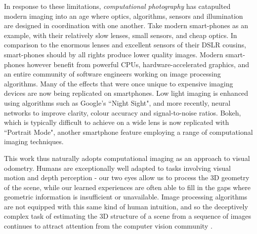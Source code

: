 In response to these limitations, \textit{computational photography} has catapulted modern imaging into an age where optics, algorithms, sensors and illumination are designed in coordination with one another. Take modern smart-phones as an example, with their relatively slow lenses, small sensors, and cheap optics. In comparison to the enormous lenses and excellent sensors of their DSLR cousins, smart-phones should by all rights produce lower quality images. Modern smart-phones however benefit from powerful CPUs, hardware-accelerated graphics, and an entire community of software engineers working on image processing algorithms. Many of the effects that were once unique to expensive imaging devices are now being replicated on smartphones. Low light imaging is enhanced using algorithms such as Google's ``Night Sight", and more recently, neural networks to improve clarity, colour accuracy and signal-to-noise ratios. Bokeh, which is typically difficult to achieve on a wide lens is now replicated with ``Portrait Mode", another smartphone feature employing a range of computational imaging techniques.

This work thus naturally adopts computational imaging as an approach to visual odometry. Humans are exceptionally well adapted to tasks involving visual motion and depth perception - our two eyes allow us to process the 3D geometry of the scene, while our learned experiences are often able to fill in the gaps where geometric information is insufficient or unavailable. Image processing algorithms are not equipped with this same kind of human intuition, and so the deceptively complex task of estimating the 3D structure of a scene from a sequence of images continues to attract attention from the computer vision community \cite{dansereau2011plenopticflow,nister2004vo,gakne2018scale,zhou2019scale}. 

